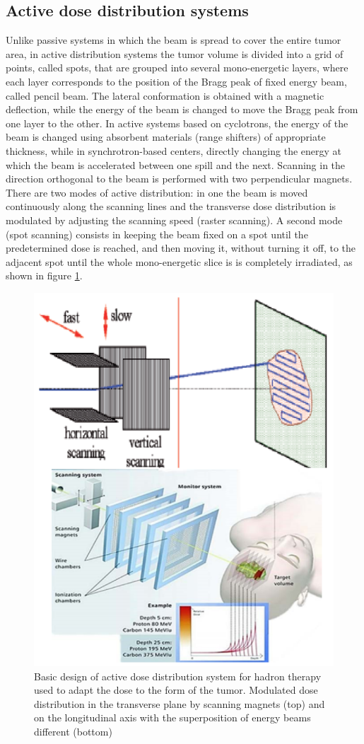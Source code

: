 \subsection{Active dose distribution systems}
\noindent Unlike passive systems in which the beam is spread to cover the entire tumor area, in active distribution systems the tumor volume is divided into a grid of points, called spots, that are grouped into several mono-energetic layers, where each layer corresponds to the position of the Bragg peak of fixed energy beam, called pencil beam.
The lateral conformation is obtained with a magnetic deflection, while the energy of the beam is changed to move the Bragg peak from one layer to the other.
In active systems based on cyclotrons, the energy of the beam is changed using absorbent materials (range shifters) of appropriate thickness, while in synchrotron-based centers, directly changing the energy at which the beam is accelerated between one spill and the next.
Scanning in the direction orthogonal to the beam is performed with two perpendicular magnets.
\newline
There are two modes of active distribution: in one the beam is moved continuously along the scanning lines and the transverse dose distribution is modulated by adjusting the scanning speed (raster scanning). A second mode (spot scanning)\cite{cnao} consists in keeping the beam fixed on a spot until the predetermined dose is reached, and then moving it, without turning it off, to the adjacent spot until the whole mono-energetic slice is is completely irradiated, as shown in figure \ref{fig:active}.
\begin{figure}[H]
	\centering
	\includegraphics[width=0.7\linewidth]{IMG/ch1/Active}
	\caption{Basic design of active dose distribution system for hadron therapy used to adapt the dose to the form of the tumor. Modulated dose distribution in the transverse plane by scanning magnets (top) and on the longitudinal axis with the superposition of energy beams different (bottom)}
	\label{fig:active}
\end{figure}

